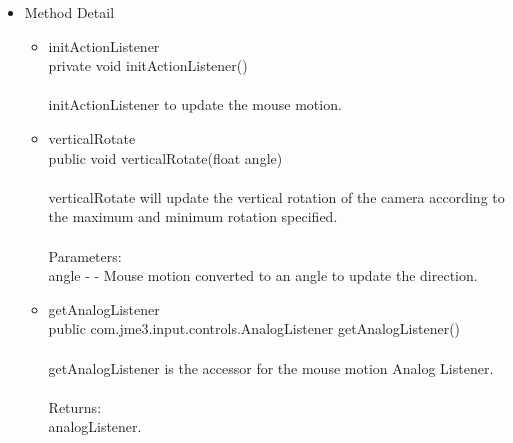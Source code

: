 \documentclass[letterpaper]{article}
\begin{document}
\begin{itemize}
								\item	Method Detail
										\begin{itemize}
											\item	initActionListener \\
													private void initActionListener() \\ \\
													initActionListener to update the mouse motion.
											\item	verticalRotate \\
													public void verticalRotate(float angle) \\ \\
													verticalRotate will update the vertical rotation of the camera according to the maximum and minimum rotation specified. \\ \\
													Parameters: \\
													angle - - Mouse motion converted to an angle to update the direction.
											\item	getAnalogListener \\
													public com.jme3.input.controls.AnalogListener getAnalogListener() \\ \\
													getAnalogListener is the accessor for the mouse motion Analog Listener. \\ \\
													Returns: \\
													analogListener.
										\end{itemize}
							\end{itemize}
						
						\vspace{0.2in}
\end{document}
